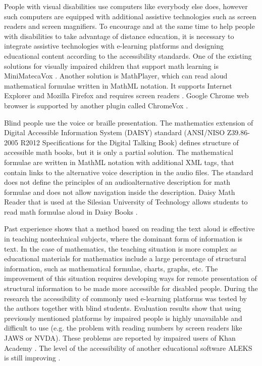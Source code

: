 \documentclass[12pt,1p]{elsarticle}
\begin{document}
	People with visual disabilities use computers like everybody else does, however such computers are equipped with additional assistive technologies such as screen readers and screen magnifiers. To encourage and at the same time to help people with disabilities to take advantage of distance education, it is necessary to integrate assistive technologies with e-learning platforms and designing educational content according to the accessibility standards. One of the existing solutions for visually impaired children that support math learning is MiniMatecaVox \cite{Henderson:2014}. Another solution is MathPlayer, which can read aloud mathematical formulae written in MathML notation. It supports Internet Explorer and Mozilla Firefox and requires screen readers \cite{Sorge:2014}. Google Chrome web browser is supported by another plugin called ChromeVox \cite{Soiffer:2016}.

	Blind people use the voice or braille presentation. The mathematics extension of Digital Accessible Information System (DAISY) standard (ANSI/NISO Z39.86-2005 R2012 Specifications for the Digital Talking Book) defines structure of accessible math books, but it is only a partial solution. The mathematical formulae are written in MathML notation with additional XML tags, that contain links to the alternative voice description in the audio files. The standard does not define the principles of an audioalternative description for math formulae and does not allow navigation inside the description. Daisy Math Reader that is used at the Silesian University of Technology allows students to read math formulae aloud in Daisy Books \cite{Garderen:2012,Brzoza:2006,Brzoza:2008,Spinczyk:2008}.

	Past experience shows that a method based on reading the text aloud is effective in teaching nontechnical subjects, where the dominant form of information is text. In the case of mathematics, the teaching situation is more complex as educational materials for mathematics include a large percentage of structural information, such as mathematical formulae, charts, graphs, etc. The improvement of this situation requires developing ways for remote presentation of structural information to be made more accessible for disabled people. During the research the accessibility of commonly used e-learning platforms was tested by the authors together with blind students. Evaluation results show that using previously mentioned platforms by impaired people is highly unavailable and difficult to use (e.g. the problem with reading numbers by screen readers like JAWS or NVDA). These problems are reported by impaired users of Khan Academy \cite{Namahoe:2017}. The level of the accessibility of another educational software ALEKS is still improving \cite{Craiga:2013}.
\end{document}
